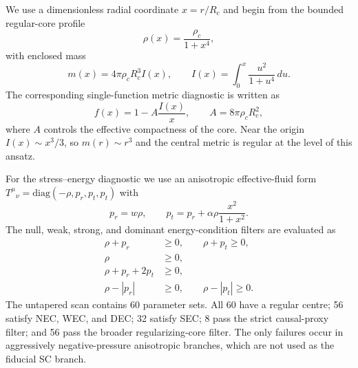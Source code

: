 \documentclass[epj]{svjour}
\begin{document}
We use a dimensionless radial coordinate $x=r/R_c$ and begin from the bounded
regular-core profile
\begin{equation}
\rho(x)=\frac{\rho_c}{1+x^4},
\label{eq:diagnostic_rho_untapered}
\end{equation}
with enclosed mass
\begin{equation}
m(x)=4\pi\rho_c R_c^3 I(x),\qquad
I(x)=\int_0^x \frac{u^2}{1+u^4}\,du .
\label{eq:diagnostic_mass_function}
\end{equation}
The corresponding single-function metric diagnostic is written as
\begin{equation}
f(x)=1-A\frac{I(x)}{x},
\qquad
A=8\pi\rho_c R_c^2,
\label{eq:diagnostic_metric_function}
\end{equation}
where $A$ controls the effective compactness of the core. Near the origin
$I(x)\sim x^3/3$, so $m(r)\sim r^3$ and the central metric is regular at the
level of this ansatz.

For the stress--energy diagnostic we use an anisotropic effective-fluid form
$T^\mu{}_{\nu}=\mathrm{diag}(-\rho,p_r,p_t,p_t)$ with
\begin{equation}
p_r=w\rho,
\qquad
p_t=p_r+\alpha\rho\frac{x^2}{1+x^2}.
\label{eq:diagnostic_pressures}
\end{equation}
The null, weak, strong, and dominant energy-condition filters are evaluated as
\begin{align}
\rho+p_r&\geq 0,\qquad \rho+p_t\geq 0,
\label{eq:diagnostic_nec}\\
\rho&\geq0,
\label{eq:diagnostic_wec}\\
\rho+p_r+2p_t&\geq0,
\label{eq:diagnostic_sec}\\
\rho-|p_r|&\geq0,\qquad \rho-|p_t|\geq0 .
\label{eq:diagnostic_dec}
\end{align}
The untapered scan contains 60 parameter sets. All 60 have a regular centre; 56
satisfy NEC, WEC, and DEC; 32 satisfy SEC; 8 pass the strict causal-proxy filter;
and 56 pass the broader regularizing-core filter. The only failures occur in
aggressively negative-pressure anisotropic branches, which are not used as the
fiducial SC branch.
\end{document}
